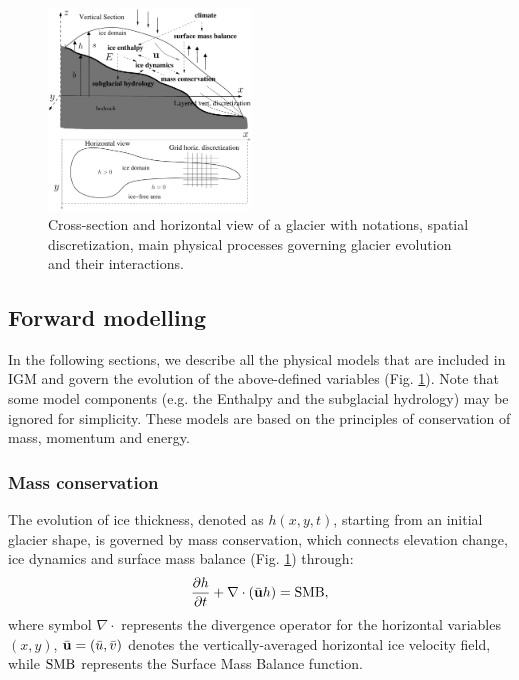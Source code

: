 \documentclass[10pt,twocolumn]{article}
\begin{document}
\begin{figure}[!h]
\begin{center} 
\includegraphics[width=0.48\textwidth]{fig/scheme.pdf}   
\end{center}
\caption{Cross-section and horizontal view of a glacier with notations, spatial discretization, 
main physical processes governing glacier evolution and their interactions. \label{notations}}
\end{figure}

\subsection{Forward modelling}

In the following sections, we describe all the physical models that are included in 
IGM and govern the evolution of the above-defined variables (Fig. \ref{notations}). 
Note that some model components (e.g. the Enthalpy and the subglacial hydrology)
may be ignored for simplicity.
These models are based on the principles of conservation of mass, momentum and energy.

\subsubsection{Mass conservation}
\label{phys_mass_conservation}

The evolution of ice thickness, denoted as $h(x, y, t)$, starting from an initial 
glacier shape, is governed by mass conservation, which connects elevation change,
ice dynamics and surface mass balance (Fig. \ref{notations}) through:
\begin{equation}
\frac{\partial h}{\partial t} + \nabla \cdot \left( \bar{\bf u} h \right) = {\rm SMB},
\label{conservationeq}
\end{equation}
where symbol $\nabla \cdot$ represents the divergence operator 
for the horizontal variables $(x, y)$, $\bar{\bf u} = (\bar{u}, \bar{v})$ denotes 
the vertically-averaged horizontal ice velocity field, while ${\rm SMB}$ represents 
the Surface Mass Balance function.
\end{document}
